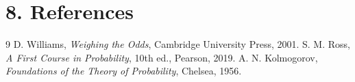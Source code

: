 \section*{8. References}
\begin{thebibliography}{9}
 D. Williams, \emph{Weighing the Odds}, Cambridge University Press, 2001.
 S. M. Ross, \emph{A First Course in Probability}, 10th ed., Pearson, 2019.
 A. N. Kolmogorov, \emph{Foundations of the Theory of Probability}, Chelsea, 1956.
\end{thebibliography}
